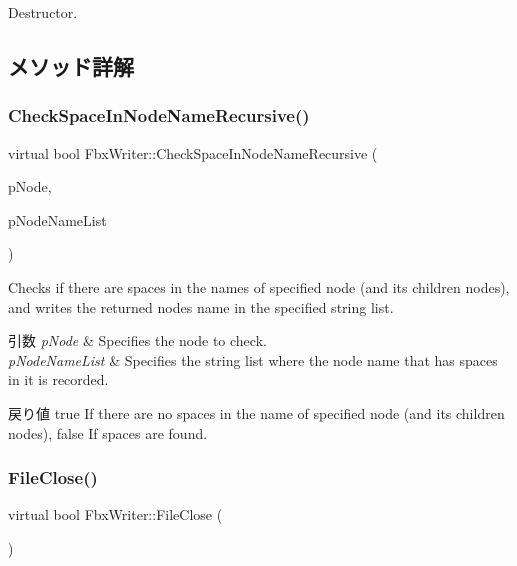 Destructor. 

\subsection{メソッド詳解}
\mbox{\label{class_fbx_writer_a9db05cf879a056dce01c960559cee27b}} 
\subsubsection{\texorpdfstring{Check\+Space\+In\+Node\+Name\+Recursive()}{CheckSpaceInNodeNameRecursive()}}
{\footnotesize\ttfamily virtual bool Fbx\+Writer\+::\+Check\+Space\+In\+Node\+Name\+Recursive (\begin{DoxyParamCaption}\item[{\hyperlink{class_fbx_node}{Fbx\+Node} $\ast$}]{p\+Node,  }\item[{\hyperlink{class_fbx_string}{Fbx\+String} \&}]{p\+Node\+Name\+List }\end{DoxyParamCaption})\hspace{0.3cm}{\ttfamily [virtual]}}

Checks if there are spaces in the names of specified node (and its children nodes), and writes the returned node\textquotesingle{}s name in the specified string list. 
\begin{DoxyParams}{引数}
{\em p\+Node} & Specifies the node to check. \\
\hline
{\em p\+Node\+Name\+List} & Specifies the string list where the node name that has spaces in it is recorded. \\
\hline
\end{DoxyParams}
\begin{DoxyReturn}{戻り値}
{\ttfamily true} If there are no spaces in the name of specified node (and its children nodes), {\ttfamily false} If spaces are found. 
\end{DoxyReturn}
\mbox{\label{class_fbx_writer_a0387142f55d0020fd5360759c12aa121}} 
\subsubsection{\texorpdfstring{File\+Close()}{FileClose()}}
{\footnotesize\ttfamily virtual bool Fbx\+Writer\+::\+File\+Close (\begin{DoxyParamCaption}{ }\end{DoxyParamCaption})\hspace{0.3cm}{\ttfamily [pure virtual]}}

